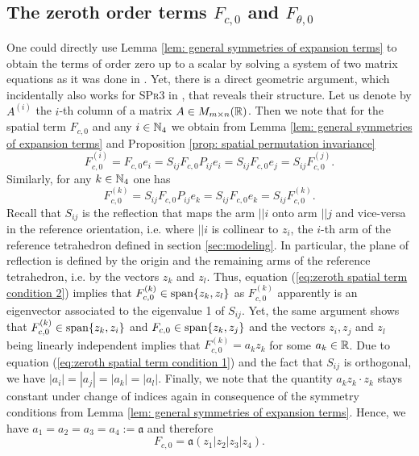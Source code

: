 \subsection{The zeroth order terms $F_{c,0}$ and $F_{\theta, 0}$} 
One could directly use Lemma \ref{lem: general symmetries of expansion terms} to obtain the terms of order zero up to a scalar by solving a system of two matrix equations as it was done in \cite{Alouges2017}. Yet, there is a direct geometric argument, which incidentally also works for \textsc{SPr3} in \cite{Alouges2017},  that reveals their structure.
Let us denote by $A^{(i)}$ the $i$-th column of a matrix $A \in M_{m \times n}(\mathbb{R})$. Then we note that for the spatial term $F_{c,0}$ and any $i \in \mathbb{N}_4$ we obtain from Lemma \ref{lem: general symmetries of expansion terms} and Proposition \ref{prop: spatial permutation invariance}
\begin{equation}
\label{eq:zeroth spatial term condition 1}
	F_{c,0}^{(i)} = F_{c,0} e_i = S_{ij} F_{c,0} P_{ij} e_i = S_{ij} F_{c,0} e_j = S_{ij} F_{c,0}^{(j)}.
\end{equation}
Similarly, for any $k \in \mathbb{N}_4$ one has
\begin{equation}
\label{eq:zeroth spatial term condition 2}
F_{c,0}^{(k)} = S_{ij} F_{c,0} P_{ij} e_k = S_{ij} F_{c,0} e_k = S_{ij} F_{c,0}^{(k)}.
\end{equation}
Recall that $S_{ij}$ is the reflection that maps the arm $||i$ onto arm $||j$ and vice-versa in the reference orientation, i.e. where $||i$ is collinear to $z_i$, the $i$-th arm of the reference tetrahedron defined in section \ref{sec:modeling}. In particular, the plane of reflection is defined by the origin and the remaining arms of the reference tetrahedron, i.e. by the vectors $z_k$ and $z_l$. Thus, equation (\ref{eq:zeroth spatial term condition 2}) implies that $F_{c,0}^{(k)} \in \operatorname{span}\{z_k, z_l\}$ as $F_{c,0}^{(k)}$ apparently is an eigenvector associated to the eigenvalue 1 of $S_{ij}$. Yet, the same argument shows that $F_{c,0}^{(k)} \in \operatorname{span}\{z_k, z_i\}$ and $F_{c,0} \in \operatorname{span}\{z_k, z_j\}$ and the vectors $z_i, z_j$ and $z_l$ being linearly independent implies that $F_{c,0}^{(k)} = a_k z_k$ for some $a_k \in \mathbb{R}$. Due to equation (\ref{eq:zeroth spatial term condition 1}) and the fact that $S_{ij}$ is orthogonal, we have $|a_i| = |a_j| = |a_k| = |a_l|$. Finally, we note that the quantity $a_k z_k \cdot z_k$ stays constant under change of indices again in consequence of the symmetry conditions from Lemma \ref{lem: general symmetries of expansion terms}. Hence, we have $a_1 = a_2 = a_3 =a_4 := \mathfrak{a}$ and therefore
\begin{equation}
	F_{c,0} = \mathfrak{a} (z_1 |z_2| z_3|z_4).
\end{equation}

